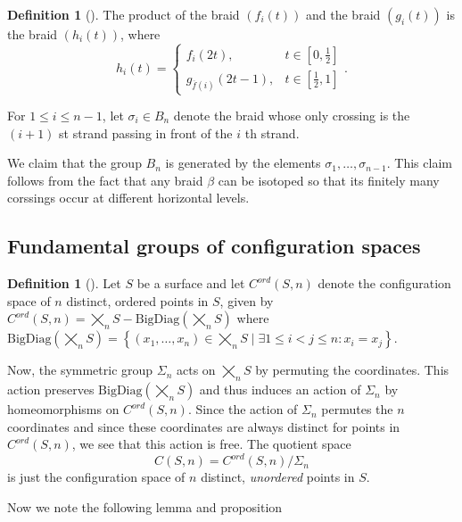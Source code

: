 \documentclass[reqno]{amsart}
\theoremstyle{definition}
\newtheorem{definition}[theorem]{Definition}
\theoremstyle{remark}
\begin{document}
\begin{definition}[]
    The product of the braid $\left( f_i(t) \right) $ and
    the braid  $\left( g_i(t) \right) $ is the
    braid $\left( h_i(t) \right) $, where
    \[
    h_i(t) = 
    \begin{cases}
        f_i(2t),& t \in \left[ 0, \frac{1}{2} \right] \\
        g_{\overline{f}(i)}(2t-1),& t \in \left[ \frac{1}{2},1
        \right] 
    \end{cases}.
    \] 
\end{definition}

For $1 \le i \le n-1$, let
$\sigma_i \in B_n$ denote the braid
whose only crossing is the
$\left( i+1 \right) $ st strand passing in front
of the $i$ th strand.

We claim that the group $B_n$ is generated by
the elements $\sigma_1, \ldots, \sigma_{n-1}$.
This claim follows from the fact that any
braid $\beta$ can be isotoped so that
its finitely many corssings occur at different horizontal levels.

\subsection{Fundamental groups of configuration spaces}

\begin{definition}[]
    Let $S$ be a surface and let $C^{ord}(S,n)$ denote
    the configuration space of $n$ distinct, ordered
    points in $S$, given by
    $C^{ord} (S,n) = 
    \bigtimes_n S - \text{BigDiag}(\bigtimes_n S)$
    where $\text{BigDiag}\left( \bigtimes_n S \right) 
    = \left\{ \left( 
    x_1, \ldots, x_n \right) \in 
\bigtimes_n S  \mid \exists 1 \le i < j \le n \colon
x_i = x_j \right\} $.
\end{definition}


Now, the symmetric group $\Sigma_n$ acts on 
$\bigtimes_n S$ by permuting
the coordinates. This action preserves $\text{BigDiag}\left( 
\bigtimes_n S\right) $ and thus induces an action
of $\Sigma_n$ by homeomorphisms on
$C^{ord}\left( S,n \right) $. Since the action of
$\Sigma_n$ permutes the $n$ coordinates and since
these coordinates are always distinct
for points in $C^{ord}\left( S,n \right) $, we see
that this action is free. The quotient space
\[
C \left( S,n \right) =
C^{ord}\left( S,n \right) / \Sigma_n
\] 
is just the configuration space of $n$ distinct,
\textit{unordered} points in $S$.


Now we note the following lemma \cite[Cor~12.27]{LeeTM}
and proposition \cite[Prop~12.22]{LeeTM}
\end{document}
